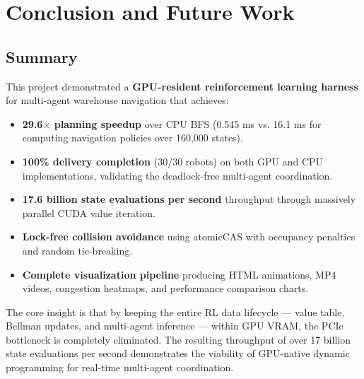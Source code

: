 \documentclass[12pt,a4paper]{article}
\begin{document}
\newpage
\section{Conclusion and Future Work}

\subsection{Summary}
This project demonstrated a \textbf{GPU-resident reinforcement learning harness} for multi-agent warehouse navigation that achieves:
\begin{itemize}
    \item \textbf{29.6$\times$ planning speedup} over CPU BFS (0.545 ms vs. 16.1 ms for computing navigation policies over 160,000 states).
    \item \textbf{100\% delivery completion} (30/30 robots) on both GPU and CPU implementations, validating the deadlock-free multi-agent coordination.
    \item \textbf{17.6 billion state evaluations per second} throughput through massively parallel CUDA value iteration.
    \item \textbf{Lock-free collision avoidance} using atomicCAS with occupancy penalties and random tie-breaking.
    \item \textbf{Complete visualization pipeline} producing HTML animations, MP4 videos, congestion heatmaps, and performance comparison charts.
\end{itemize}

The core insight is that by keeping the entire RL data lifecycle --- value table, Bellman updates, and multi-agent inference --- within GPU VRAM, the PCIe bottleneck is completely eliminated. The resulting throughput of over 17 billion state evaluations per second demonstrates the viability of GPU-native dynamic programming for real-time multi-agent coordination.
\end{document}
